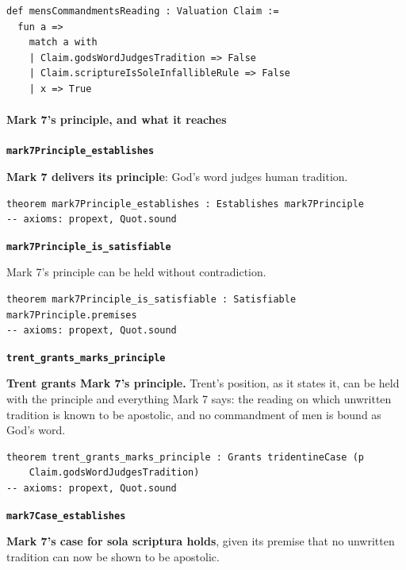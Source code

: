 \documentclass[11pt]{article}
\begin{document}
{\small\begin{verbatim}
def mensCommandmentsReading : Valuation Claim :=
  fun a =>
    match a with
    | Claim.godsWordJudgesTradition => False
    | Claim.scriptureIsSoleInfallibleRule => False
    | x => True
\end{verbatim}}
\paragraph*{Mark 7’s principle, and what it reaches}
\leavevmode\par\nobreak
\par\medskip\noindent\textbf{\texttt{mark7\allowbreak{}Principle\_\allowbreak{}establishes}}\par\nobreak\noindent
\textbf{Mark 7 delivers its principle}: God’s word judges human tradition.

{\small\begin{verbatim}
theorem mark7Principle_establishes : Establishes mark7Principle
-- axioms: propext, Quot.sound
\end{verbatim}}
\par\medskip\noindent\textbf{\texttt{mark7\allowbreak{}Principle\_\allowbreak{}is\_\allowbreak{}satisfiable}}\par\nobreak\noindent
Mark 7’s principle can be held without contradiction.

{\small\begin{verbatim}
theorem mark7Principle_is_satisfiable : Satisfiable mark7Principle.premises
-- axioms: propext, Quot.sound
\end{verbatim}}
\par\medskip\noindent\textbf{\texttt{trent\_\allowbreak{}grants\_\allowbreak{}marks\_\allowbreak{}principle}}\par\nobreak\noindent
\textbf{Trent grants Mark 7’s principle.} Trent’s position, as it states it, can be held with the principle and everything Mark 7 says: the reading on which unwritten tradition is known to be apostolic, and no commandment of men is bound as God’s word.

{\small\begin{verbatim}
theorem trent_grants_marks_principle : Grants tridentineCase (p
    Claim.godsWordJudgesTradition)
-- axioms: propext, Quot.sound
\end{verbatim}}
\par\medskip\noindent\textbf{\texttt{mark7\allowbreak{}Case\_\allowbreak{}establishes}}\par\nobreak\noindent
\textbf{Mark 7’s case for sola scriptura holds}, given its premise that no unwritten tradition can now be shown to be apostolic.
\end{document}

